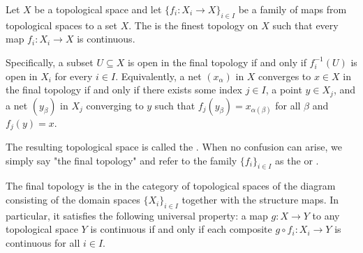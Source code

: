 \begin{definition} \label{definition:final_topology_on_a_set_with_respect_to_a_family_of_functions}

    Let $X$ be a topological space and let $\{f_i : X_i \to X\}_{i \in I}$ be a family of maps from topological spaces to a set $X$. The  is the finest topology on $X$ such that every map $f_i : X_i \to X$ is continuous.

    Specifically, a subset $U \subseteq X$ is open in the final topology if and only if $f_i^{-1}(U)$ is open in $X_i$ for every $i \in I$. Equivalently, a net $(x_\alpha)$ in $X$ converges to $x \in X$ in the final topology if and only if there exists some index $j \in I$, a point $y \in X_j$, and a net $(y_\beta)$ in $X_j$ converging to $y$ such that $f_j(y_\beta) = x_{\alpha(\beta)}$ for all $\beta$ and $f_j(y) = x$.

    The resulting topological space is called the . When no confusion can arise, we simply say "the final topology" and refer to the family $\{f_i\}_{i \in I}$ as the  or .

    The final topology is the  in the category of topological spaces of the diagram consisting of the domain spaces $\{X_i\}_{i \in I}$ together with the structure maps. In particular, it satisfies the following universal property: a map $g : X \to Y$ to any topological space $Y$ is continuous if and only if each composite $g \circ f_i : X_i \to Y$ is continuous for all $i \in I$.
\end{definition}
